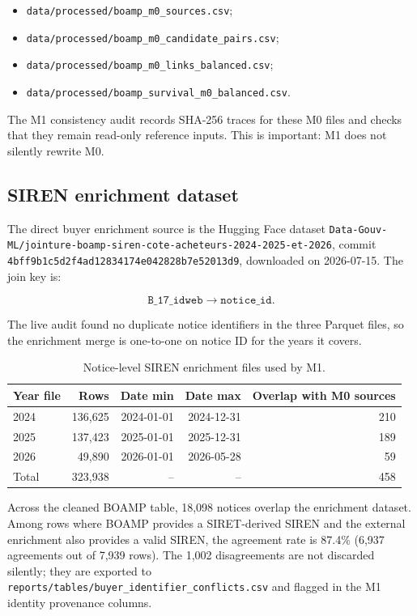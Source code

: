 \documentclass[11pt]{article}
\begin{document}
\begin{itemize}
  \item \texttt{data/processed/boamp\_m0\_sources.csv};
  \item \texttt{data/processed/boamp\_m0\_candidate\_pairs.csv};
  \item \texttt{data/processed/boamp\_m0\_links\_balanced.csv};
  \item \texttt{data/processed/boamp\_survival\_m0\_balanced.csv}.
\end{itemize}

The M1 consistency audit records SHA-256 traces for these M0 files and
checks that they remain read-only reference inputs. This is important:
M1 does not silently rewrite M0.

\subsection{SIREN enrichment dataset}

The direct buyer enrichment source is the Hugging Face dataset
\texttt{Data-Gouv-ML/jointure-boamp-siren-cote-acheteurs-2024-2025-et-2026},
commit \texttt{4bff9b1c5d2f4ad12834174e042828b7e52013d9}, downloaded on
2026-07-15. The join key is:

\[
\texttt{B\_17\_idweb} \longrightarrow \texttt{notice\_id}.
\]

The live audit found no duplicate notice identifiers in the three Parquet
files, so the enrichment merge is one-to-one on notice ID for the years it
covers.

\begin{table}[h]
\centering
\caption{Notice-level SIREN enrichment files used by M1.}
\begin{tabular}{lrrrr}
\toprule
Year file & Rows & Date min & Date max & Overlap with M0 sources\\
\midrule
2024 & 136,625 & 2024-01-01 & 2024-12-31 & 210\\
2025 & 137,423 & 2025-01-01 & 2025-12-31 & 189\\
2026 & 49,890 & 2026-01-01 & 2026-05-28 & 59\\
\midrule
Total & 323,938 & -- & -- & 458\\
\bottomrule
\end{tabular}
\end{table}

Across the cleaned BOAMP table, 18,098 notices overlap the enrichment
dataset. Among rows where BOAMP provides a SIRET-derived SIREN and the
external enrichment also provides a valid SIREN, the agreement rate is
87.4\% (6,937 agreements out of 7,939 rows). The 1,002 disagreements are
not discarded silently; they are exported to
\texttt{reports/tables/buyer\_identifier\_conflicts.csv} and flagged in
the M1 identity provenance columns.
\end{document}
